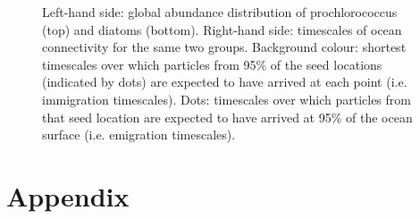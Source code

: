 \documentclass[12pt]{article}
\begin{document}
\begin{figure}[htp!]

\caption{Left-hand side: global abundance distribution of prochlorococcus (top) and diatoms (bottom). Right-hand side: timescales of ocean connectivity for the same two groups. Background colour: shortest timescales over which particles from 95\% of the seed locations (indicated by dots) are expected to have arrived at each point (i.e. immigration timescales). Dots: timescales over which particles from that seed location are expected to have arrived at 95\% of the ocean surface (i.e. emigration timescales).}
\label{connectivity_90_prctile}
\end{figure}
















\clearpage
{}
\appendix

\section{Appendix}
\end{document}
